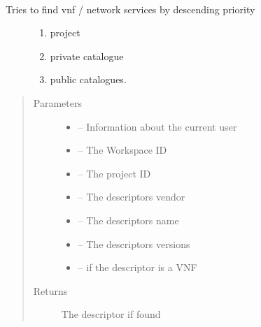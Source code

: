 \documentclass[letterpaper,10pt,english]{sphinxmanual}
\begin{document}
\begin{fulllineitems}
\label{_source/son_editor.impl:son_editor.impl.nsfslookupimpl.find_by_priority}~\begin{description}
\item[{Tries to find vnf / network services by descending priority}] \leavevmode\begin{enumerate}
\item {} 
project

\item {} 
private catalogue

\item {} 
public catalogues.

\end{enumerate}

\end{description}
\begin{quote}\begin{description}
\item[{Parameters}] \leavevmode\begin{itemize}
\item {} 
 -- Information about the current user

\item {} 
 -- The Workspace ID

\item {} 
 -- The project ID

\item {} 
 -- The descriptors vendor

\item {} 
 -- The descriptors name

\item {} 
 -- The descriptors versions

\item {} 
 -- if the descriptor is a VNF

\end{itemize}

\item[{Returns}] \leavevmode
The descriptor if found

\end{description}\end{quote}

\end{fulllineitems}
\end{document}
